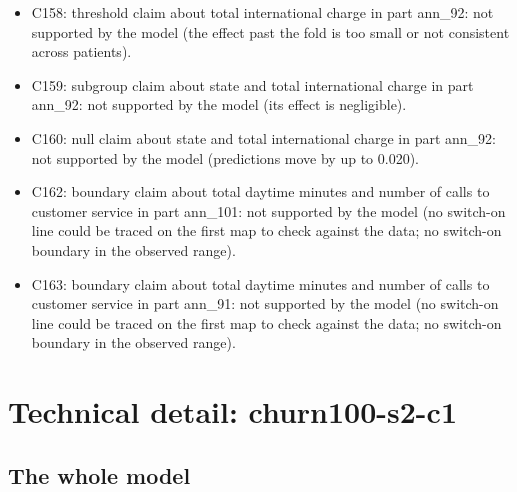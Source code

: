 \documentclass[a4paper,10pt]{article}
\newif\ifreviewmarks
\newcommand{\reviewrule}{\noindent{\color{BrickRed}\rule{\linewidth}{0.8pt}}}
\newenvironment{drafted}[1][]{%
  \ifreviewmarks\par\addvspace{\medskipamount}\reviewrule\par\nopagebreak
  \noindent{\color{BrickRed}\sffamily\footnotesize\textbf{Thesis Draft}\quad #1\hfill review}\par\nopagebreak\smallskip\fi}{%
  \ifreviewmarks\par\smallskip\noindent{\color{BrickRed}\sffamily\footnotesize end of thesis draft}\par\nopagebreak\reviewrule\par\medskip\fi}
\begin{document}
\begin{drafted}[plain-language layer: churn100-s2-c1]
\begin{itemize}
\item C158: threshold claim about total international charge in part ann\_\allowbreak{}92: not supported by the model (the effect past the fold is too small or not consistent across patients).
\item C159: subgroup claim about state and total international charge in part ann\_\allowbreak{}92: not supported by the model (its effect is negligible).
\item C160: null claim about state and total international charge in part ann\_\allowbreak{}92: not supported by the model (predictions move by up to 0.020).
\item C162: boundary claim about total daytime minutes and number of calls to customer service in part ann\_\allowbreak{}101: not supported by the model (no switch-on line could be traced on the first map to check against the data; no switch-on boundary in the observed range).
\item C163: boundary claim about total daytime minutes and number of calls to customer service in part ann\_\allowbreak{}91: not supported by the model (no switch-on line could be traced on the first map to check against the data; no switch-on boundary in the observed range).
\end{itemize}
\clearpage\section*{Technical detail: churn100-s2-c1}
\renewcommand{\thesubsection}{T.\arabic{subsection}}\setcounter{subsection}{0}
\subsection{The whole model}\label{tech:ann102}

\end{drafted}
\end{document}
